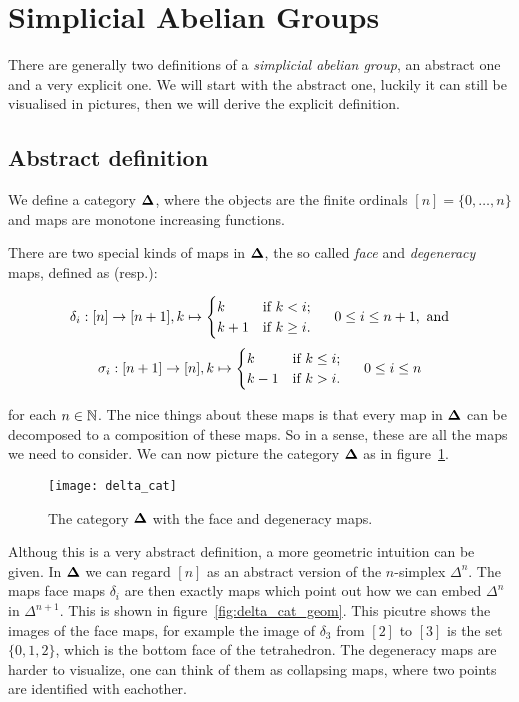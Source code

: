 \section{Simplicial Abelian Groups}
\label{sec:Simplicial Abelian Groups}

There are generally two definitions of a \emph{simplicial abelian group}, an abstract one and a very explicit one. We will start with the abstract one, luckily it can still be visualised in pictures, then we will derive the explicit definition.

\subsection{Abstract definition}
\begin{definition}
	We define a category $\mathbf{\Delta}$, where the objects are the finite ordinals $[n] = \{0, \dots, n\}$ and maps are monotone increasing functions.
\end{definition}

There are two special kinds of maps in $\mathbf{\Delta}$, the so called \emph{face} and \emph{degeneracy} maps, defined as (resp.):

$$\delta_i: [n] \to [n+1], k \mapsto \begin{cases} k & \text{if } k < i;\\ k+1 & \text{if } k \geq i. \end{cases} \hspace{0.5cm} 0 \leq i \leq n+1, \text{ and}$$
$$\sigma_i: [n+1] \to [n], k \mapsto \begin{cases} k & \text{if } k \leq i;\\ k-1 & \text{if } k > i. \end{cases} \hspace{0.5cm} 0 \leq i \leq n$$

for each $n \in \mathbb{N}$. The nice things about these maps is that every map in $\mathbf{\Delta}$ can be decomposed to a composition of these maps.  So in a sense, these are all the maps we need to consider. We can now picture the category $\mathbf{\Delta}$ as in figure~\ref{fig:delta_cat}.

\begin{figure}[h!]
	\texttt{[image: delta\_cat]}
	\caption{The category $\mathbf{\Delta}$ with the face and degeneracy maps.}
	\label{fig:delta_cat}
\end{figure}

Althoug this is a very abstract definition, a more geometric intuition can be given. In $\mathbf{\Delta}$ we can regard $[n]$ as an abstract version of the $n$-simplex $\Delta^n$. The maps face maps $\delta_i$ are then exactly maps which point out how we can embed $\Delta^n$ in $\Delta^{n+1}$. This is shown in figure~\ref{fig:delta_cat_geom}. This picutre shows the images of the face maps, for example the image of $\delta_3$ from $[2]$ to $[3]$ is the set $\{0,1,2\}$, which is the bottom face of the tetrahedron. The degeneracy maps are harder to visualize, one can think of them as collapsing maps, where two points are identified with eachother. 

